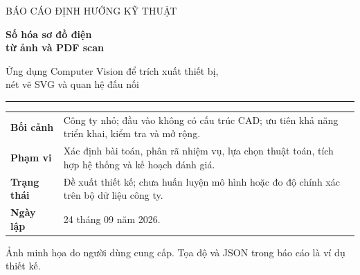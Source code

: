 \documentclass[11pt,a4paper]{article}
\begin{document}
\hypersetup{pageanchor=false}
\begin{titlepage}
\color{Navy}
\vspace*{10mm}
{\sffamily\large BÁO CÁO ĐỊNH HƯỚNG KỸ THUẬT\par}
\vspace{8mm}
{\sffamily\bfseries\fontsize{29}{36}\selectfont Số hóa sơ đồ điện\\từ ảnh và PDF scan\par}
\vspace{6mm}
{\Large Ứng dụng Computer Vision để trích xuất thiết bị,\\nét vẽ SVG và quan hệ đấu nối\par}
\vspace{10mm}
{\color{Teal}\rule{\linewidth}{1.3pt}}
\vspace{7mm}
\vfill
\color{black}
\begin{tabularx}{\linewidth}{@{}p{34mm}Y@{}}
\textbf{Bối cảnh} & Công ty nhỏ; đầu vào không có cấu trúc CAD; ưu tiên khả năng triển khai, kiểm tra và mở rộng.\\
\textbf{Phạm vi} & Xác định bài toán, phân rã nhiệm vụ, lựa chọn thuật toán, tích hợp hệ thống và kế hoạch đánh giá.\\
\textbf{Trạng thái} & Đề xuất thiết kế; chưa huấn luyện mô hình hoặc đo độ chính xác trên bộ dữ liệu công ty.\\
\textbf{Ngày lập} & 24 tháng 09 năm 2026.\\
\end{tabularx}\par
\vspace{6mm}
{\small\raggedright\color{Muted}Ảnh minh họa do người dùng cung cấp. Tọa độ và JSON trong báo cáo là ví dụ thiết kế.\par}
\end{titlepage}

\hypersetup{pageanchor=true}
\end{document}
